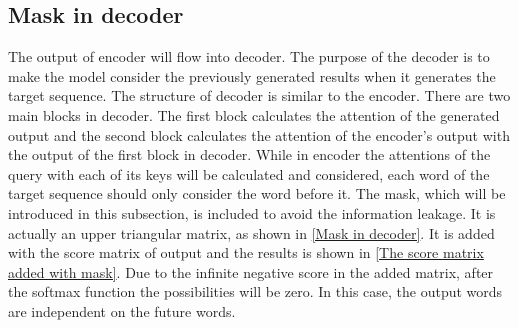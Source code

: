 \subsection{Mask in decoder}
  The output of encoder will flow into decoder. The purpose of the decoder is to make the model consider the previously generated results when it generates the target sequence.
  The structure of decoder is similar to the encoder. There are two main blocks in decoder. The first block calculates the attention of the generated output and the second 
  block calculates the attention of the encoder's output with the output of the first block in decoder. While in encoder the attentions of the query with each of its keys will be
  calculated and considered, each word of the target sequence should only consider the word before it. The mask, which will be introduced in this subsection, is included to avoid 
  the information leakage. It is actually an upper triangular matrix, as shown in \autoref{Mask in decoder}. It is added with the score matrix of output and the results is shown
  in \autoref{The score matrix added with mask}. Due to the infinite negative score in the added matrix, after the softmax function the possibilities will be zero. In this case,
  the output words are independent on the future words.
